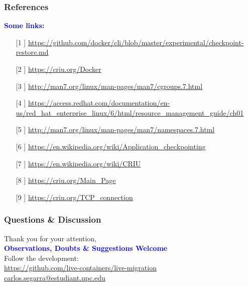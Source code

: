 \documentclass[9pt,    %
    english,            %
    xcolor=table,       %
    envcountsect,        %
    aspectratio=169     %
]{beamer}
\begin{document}
\begin{frame}
    \frametitle{References}

    \textbf{\textcolor{blue}{Some links:}}

    \small

    \begin{enumerate}
        \item[[1]] \url{https://github.com/docker/cli/blob/master/experimental/checkpoint-restore.md}
        \item[[2]] \url{https://criu.org/Docker}
        \item[[3]] \url{http://man7.org/linux/man-pages/man7/cgroups.7.html}
        \item[[4]] \url{https://access.redhat.com/documentation/en-us/red_hat_enterprise_linux/6/html/resource_management_guide/ch01}
        \item[[5]] \url{http://man7.org/linux/man-pages/man7/namespaces.7.html}
        \item[[6]] \url{https://en.wikipedia.org/wiki/Application_checkpointing}
        \item[[7]] \url{https://en.wikipedia.org/wiki/CRIU}
        \item[[8]] \url{https://criu.org/Main_Page}
        \item[[9]] \url{https://criu.org/TCP_connection}
    \end{enumerate}

\end{frame}

\begin{frame}
    \frametitle{Questions \& Discussion}

    \begin{center}
        Thank you for your attention,\\[5pt]

        \Large
        \textbf{\textcolor{blue}{Observations, Doubts \& Suggestions Welcome}}\\[25pt]

        \normalsize
        Follow the development:\\ \url{https://github.com/live-containers/live-migration}\\[15pt]
        \url{carlos.segarra@estudiant.upc.edu}
    \end{center}
\end{frame}
\end{document}
